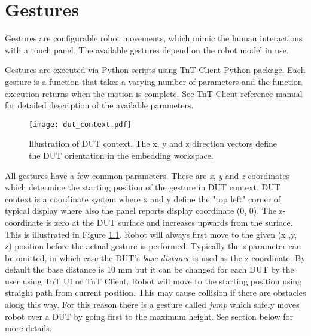 \chapter{Gestures}
Gestures are configurable robot movements, which mimic the human interactions with a touch panel. The available gestures depend on the robot model in use.

Gestures are executed via Python scripts using TnT Client Python package. Each gesture is a function that takes a varying number of parameters and the function execution returns when the motion is complete. See TnT Client reference manual for detailed description of the available parameters.


\begin{figure}[h]
	\centering
	\texttt{[image: dut\_context.pdf]}
	\caption{Illustration of DUT context. The x, y and z direction vectors define the DUT orientation in the embedding workspace.}
	\label{fig:dut_context}
\end{figure}

All gestures have a few common parameters. These are \emph{x}, \emph{y} and \emph{z} coordinates which determine the starting position of the gesture in DUT context. DUT context is a coordinate system where x and y define the "top left" corner of typical display where also the panel reports display coordinate (0, 0). The z-coordinate is zero at the DUT surface and increases upwards from the surface. This is illustrated in Figure \ref{fig:dut_context}. Robot will always first move to the given (x ,y, z) position before the actual gesture is performed. Typically the \emph{z} parameter can be omitted, in which case the DUT's \emph{base distance} is used as the z-coordinate. By default the base distance is 10 mm but it can be changed for each DUT by the user using TnT UI or TnT Client. Robot will move to the starting position using straight path from current position. This may cause collision if there are obstacles along this way. For this reason there is a gesture called \emph{jump} which safely moves robot over a DUT by going first to the maximum height. See section below for more details.

